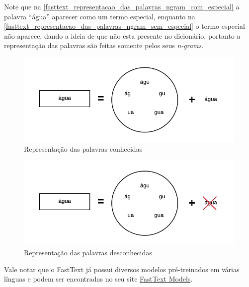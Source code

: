 Note que na \autoref{fasttext_representacao_das_palavras_ngram_com_especial} a palavra “água” aparecer como um termo especial, enquanto na \autoref{fasttext_representacao_das_palavras_ngram_sem_especial} o termo especial não aparece, dando a ideia de que não esta presente no dicionário, portanto a representação das palavras são feitas somente pelos seus \textit{n-grams}.

\begin{figure}[htb]
	\caption{\label{fasttext_representacao_das_palavras_ngram_com_especial} Representação das palavras conhecidas}
	\begin{center}
	    \includegraphics[scale=1.0]{artigo/recursos/imagens/fasttext_representacao_das_palavras_ngram_com_especial.png}
	\end{center}
\end{figure}

\begin{figure}[htb]
	\caption{\label{fasttext_representacao_das_palavras_ngram_sem_especial} Representação das palavras desconhecidas}
	\begin{center}
	    \includegraphics[scale=1.0]{artigo/recursos/imagens/fasttext_representacao_das_palavras_ngram_sem_especial.png}
	\end{center}
\end{figure}

Vale notar que o FastText já possui diversos modelos pré-treinados em várias línguas e podem ser encontradas no seu site \href{https://fasttext.cc/docs/en/english-vectors.html}{FastText Models}.

